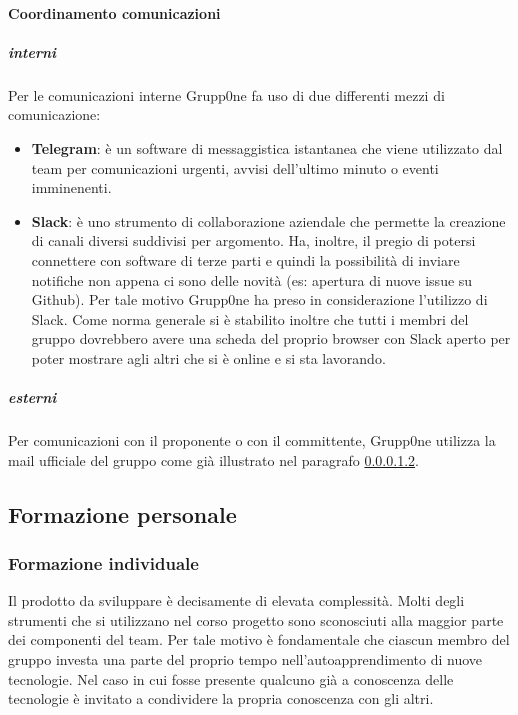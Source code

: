 \documentclass[../norme-di-progetto.tex]{subfiles}
\begin{document}
\paragraph{Coordinamento comunicazioni}
\label{par:coordinamento comunicazioni}
\subparagraph{interni}
\label{subp:interni}
Per le comunicazioni interne Grupp0ne fa uso di due differenti mezzi di comunicazione:
\begin{itemize}
	\item \textbf{Telegram}: è un software di messaggistica istantanea che viene utilizzato dal team per comunicazioni urgenti, avvisi dell'ultimo minuto o eventi imminenenti.
	\item \textbf{Slack}: è uno strumento di collaborazione aziendale che permette la creazione di canali diversi suddivisi per argomento. Ha, inoltre, il pregio di potersi connettere con software di terze parti e quindi la possibilità di inviare notifiche non appena ci sono delle novità (es: apertura di nuove issue su Github). Per tale motivo Grupp0ne ha preso in considerazione l'utilizzo di Slack. Come norma generale si è stabilito inoltre che tutti i membri del gruppo dovrebbero avere una scheda del proprio browser con Slack aperto per poter mostrare agli altri che si è online e si sta lavorando.
\end{itemize}
\subparagraph{esterni}
\label{subp:interni}
Per comunicazioni con il proponente o con il committente, Grupp0ne utilizza la mail ufficiale del gruppo come già illustrato nel paragrafo \ref{subp:interni}.
\subsection{Formazione personale}
\subsubsection{Formazione individuale}
Il prodotto da sviluppare è decisamente di elevata complessità. Molti degli strumenti che si utilizzano nel corso  progetto sono sconosciuti alla maggior parte dei componenti del team. Per tale motivo è fondamentale che ciascun membro del gruppo investa una parte del proprio tempo nell'autoapprendimento di nuove tecnologie. Nel caso in cui fosse presente qualcuno già a conoscenza delle tecnologie è invitato a condividere la propria conoscenza con gli altri.
\end{document}
